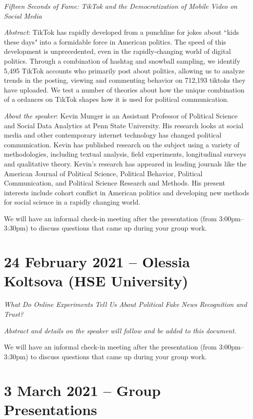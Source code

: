\documentclass[abstract=on,parskip=full,headings=standardclasses,fontsize=11pt,paper=a4]{scrartcl}
\begin{document}
 
\textit{Fifteen Seconds of Fame: TikTok and the Democratization of Mobile Video on Social Media}


\textit{Abstract}: TikTok has rapidly developed from a punchline for jokes about “kids these days" into a formidable force in American politics. The speed of this development is unprecedented, even in the rapidly-changing world of digital politics. Through a combination of hashtag and snowball sampling, we identify 5,495 TikTok accounts who primarily post about politics, allowing us to analyze trends in the posting, viewing and commenting behavior on 712,193 tiktoks they have uploaded. We test a number of theories about how the unique combination of a ordances on TikTok shapes how it is used for political communication.

\textit{About the speaker}: Kevin Munger is an Assistant Professor of Political Science and Social Data Analytics at Penn State University. His research looks at social media and other contemporary internet technology has changed political communication. Kevin has published research on the subject using a variety of methodologies, including textual analysis, field experiments, longitudinal surveys and qualitative theory. Kevin's research has appeared in leading journals like the American Journal of Political Science, Political Behavior, Political Communication, and Political Science Research and Methods. His present interests include cohort conflict in American politics and developing new methods for social science in a rapidly changing world.
  
  
  
We will have an informal check-in meeting after the presentation (from 3:00pm--3:30pm) to discuss questions that came up during your group work.
  
  
\section{24 February 2021 -- Olessia Koltsova (HSE University)} 

\textit{What Do Online Experiments Tell Us About Political Fake News Recognition and Trust?}


\textit{Abstract and details on the speaker will follow and be added to this document.}


We will have an informal check-in meeting after the presentation (from 3:00pm--3:30pm) to discuss questions that came up during your group work.


\section{3 March 2021 -- Group Presentations}
\end{document}
